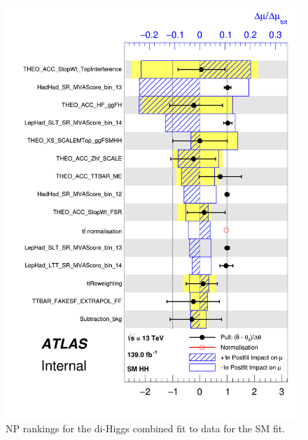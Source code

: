 \begin{figure}
\centering
\includegraphics[width=.8\textwidth]{figures/results/HH/Combined/Rankings/rank_0}
\caption{NP rankings for the di-Higgs combined fit to data for the SM fit.}
\label{fig:CombinedPostfitNPRankingsSM}
\end{figure}

